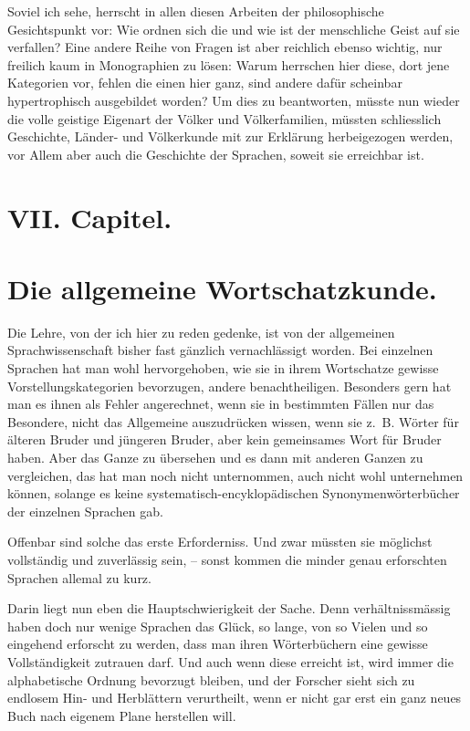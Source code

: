 Soviel ich sehe, herrscht in allen diesen Arbeiten der philosophische Gesichtspunkt vor: Wie ordnen sich die  und wie ist der menschliche Geist auf sie verfallen? Eine andere Reihe von Fragen ist aber reichlich ebenso wichtig, nur freilich kaum in Monographien zu lösen: Warum herrschen hier diese, dort jene Kategorien vor, fehlen die einen hier ganz, sind andere dafür scheinbar hypertrophisch ausgebildet worden? Um dies zu beantworten, müsste nun wieder die volle geistige Eigenart der Völker und Völkerfamilien, müssten schliesslich Geschichte, Länder- und Völkerkunde mit zur Erklärung herbeigezogen werden, vor Allem aber auch die Geschichte der Sprachen, soweit sie erreichbar ist.

\section*{VII. Capitel.}\label{IV.VII}
\section*{Die allgemeine Wortschatzkunde.}

Die Lehre, von der ich hier zu reden gedenke, ist von der allgemeinen Sprachwissenschaft bisher fast gänzlich vernachlässigt worden. Bei einzelnen Sprachen hat man wohl hervorgehoben, wie sie in ihrem Wortschatze gewisse Vorstellungskategorien bevorzugen, andere benachtheiligen. Besonders gern hat man es ihnen als Fehler angerechnet, wenn sie in bestimmten Fällen nur das Besondere, nicht das Allgemeine auszudrücken wissen, wenn sie z.~B. Wörter für älteren Bruder und jüngeren Bruder, aber kein gemeinsames Wort für Bruder haben. Aber \label{fp.463} das Ganze zu übersehen und es dann mit anderen Ganzen zu vergleichen, das hat man noch nicht unternommen, auch nicht wohl unternehmen können, solange es keine systematisch-encyklopädischen Synonymenwörterbücher der einzelnen Sprachen gab.

Offenbar sind solche das erste Erforderniss. Und zwar müssten sie möglichst vollständig und zuverlässig sein, – sonst kommen die minder genau erforschten Sprachen allemal zu kurz.

Darin liegt nun eben die Hauptschwierigkeit der Sache. Denn verhältnissmässig haben doch nur wenige Sprachen das Glück, so lange, von so Vielen \label{sp.483} und so eingehend erforscht zu werden, dass man ihren Wörterbüchern eine gewisse Vollständigkeit zutrauen darf. Und auch wenn diese erreicht ist, wird immer die alphabetische Ordnung bevorzugt bleiben, und der Forscher sieht sich zu endlosem Hin- und Herblättern verurtheilt, wenn er nicht gar erst ein ganz neues Buch nach eigenem Plane herstellen will.

